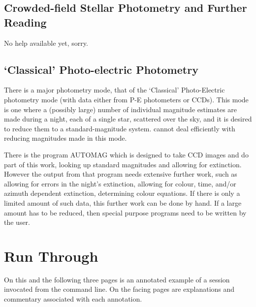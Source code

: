 \subsection{Crowded-field Stellar Photometry and Further Reading}


No help available yet, sorry.

\subsection{`Classical' Photo-electric Photometry}

There is a major photometry mode, that of the `Classical' Photo-Electric
photometry mode (with data either from P-E photometers or CCDs). This mode
is one where a (possibly large) number of individual magnitude estimates
are made during a night, each of a single star, scattered over the sky, and
it is desired to reduce them to a standard-magnitude system. \starman cannot
deal efficiently with  reducing magnitudes made in this mode.

There is the \starman program AUTOMAG which is designed to take CCD
images and do part of this work, looking up standard magnitudes and allowing
for extinction. However the output from that program needs extensive
further work, such as allowing for errors in the night's extinction,
allowing for colour, time, and/or azimuth dependent extinction, determining
colour equations. If there is only a limited amount of such data, this
further work can be done by hand. If a large amount has to be reduced, then
special purpose programs need to be written by the user.




\newpage

\section{Run Through}
\label{se:run_through}

On this and the following three pages is an annotated example of a \starman
session invocated from the command line. On the facing pages are
explanations and commentary associated with each annotation.


